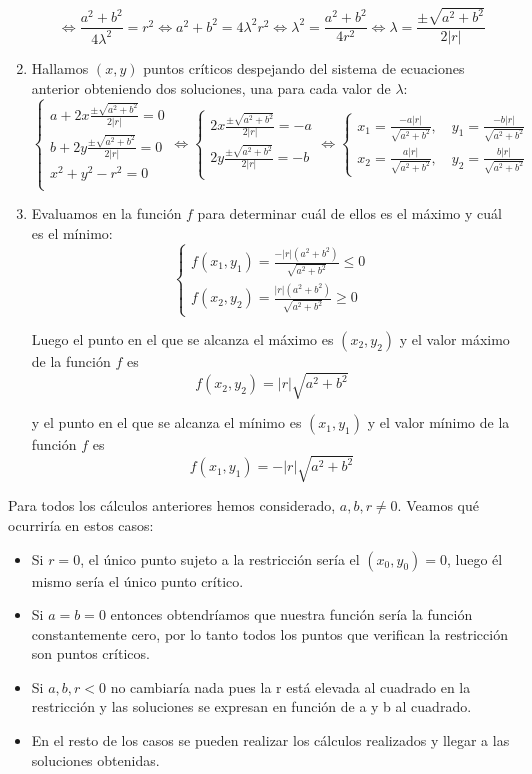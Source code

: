 \documentclass{article}
\begin{document}
\begin{enumerate}
		\[
		\iff
		\frac{a^2 + b^2}{4\lambda^2} = r^2
		\iff
		a^2 + b^2 = 4\lambda^2r^2 
		\iff
		\lambda^2 = \frac{a^2 + b^2}{4r^2}
		\iff
		\lambda = \frac{\pm \sqrt{a^2 + b^2}}{2|r|}
		\]
		\item Hallamos $(x,y)$ puntos críticos despejando del sistema de ecuaciones anterior obteniendo dos soluciones, una para cada valor de $\lambda$:
		\[
			\begin{cases}
			a + 2x\frac{\pm \sqrt{a^2 + b^2}}{2|r|} = 0\\
			b + 2y\frac{\pm \sqrt{a^2 + b^2}}{2|r|} = 0\\
			x^2 + y^2 - r^2 = 0\\
			\end{cases}
			\iff
			\begin{cases}
			2x\frac{\pm \sqrt{a^2 + b^2}}{2|r|} = -a\\
			2y\frac{\pm \sqrt{a^2 + b^2}}{2|r|} = -b\\
			\end{cases}
			\iff
			\begin{cases}
				x_1 = \frac{-a|r|}{\sqrt{a^2 + b^2}}, \quad y_ 1 = \frac{-b|r|}{\sqrt{a^2 + b^2}}
				\\x_2 = \frac{a|r|}{\sqrt{a^2 + b^2}}, \quad y_ 2 = \frac{b|r|}{\sqrt{a^2 + b^2}}
			\end{cases}
		\]
		\item Evaluamos en la función $f$ para determinar cuál de ellos es el máximo y cuál es el mínimo:
		\[
		\begin{cases}
			f(x_1,y_1) = \frac{-|r|(a^2 + b^2)}{\sqrt{a^2 + b^2}} \leq 0 
			\\f(x_2,y_2) = \frac{|r|(a^2 + b^2)}{\sqrt{a^2 + b^2}} \geq 0
		\end{cases}
		\]
		
		Luego el punto en el que se alcanza el máximo es $(x_2, y_2)$ y el valor máximo de la función $f$ es 
		\[
			f(x_2, y_2) = |r|\sqrt{a^2 + b^2}
		\]		

y el punto en el que se alcanza el mínimo es $(x_1, y_1)$ y el valor mínimo de la función $f$ es 
		\[
			f(x_1, y_1) = -|r|\sqrt{a^2 + b^2}
		\]
		
	\end{enumerate}

	Para todos los cálculos anteriores hemos considerado, $a,b,r \ne 0$. Veamos qué ocurriría en estos casos:
	
	\begin{itemize}
		\item Si $r = 0$, el único punto sujeto a la restricción sería el $(x_0, y_0) = 0$, luego él mismo sería el único punto crítico.
		\item Si $a = b = 0$ entonces obtendríamos que nuestra función sería la función constantemente cero, por lo tanto todos los puntos que verifican la restricción son puntos críticos.
		\item Si $a,b,r < 0$ no cambiaría nada pues la r está elevada al cuadrado en la restricción y las soluciones se expresan en función de a y b al cuadrado.
		\item En el resto de los casos se pueden realizar los cálculos realizados y llegar a las soluciones obtenidas.
	\end{itemize}
\end{document}
